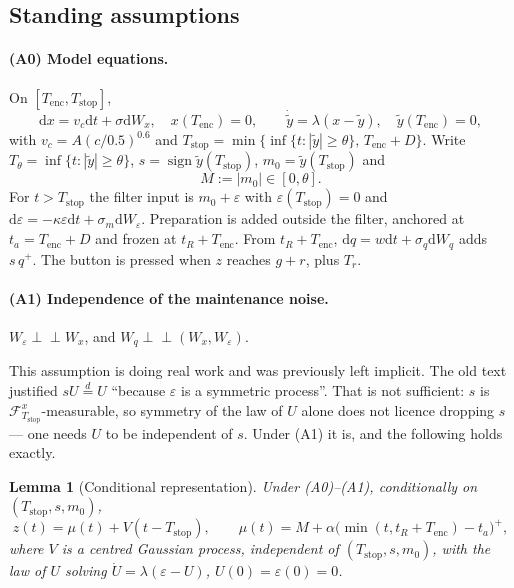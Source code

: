 \documentclass[11pt,a4paper]{article}
\newcommand{\dd}{\mathrm{d}}
\newcommand{\Tstop}{T_{\text{stop}}}
\newcommand{\Mrv}{M}
\theoremstyle{plain}
\newtheorem{lemma}{Lemma}
\theoremstyle{remark}
\begin{document}
\subsection{Standing assumptions}
\label{sec:assump}

\paragraph{(A0) Model equations.} On $[T_{\text{enc}},\Tstop]$,
\begin{equation}
\dd x=v_c\dd t+\sigma\dd W_x,\quad x(T_{\text{enc}})=0,
\qquad \dot{\tilde y}=\lambda(x-\tilde y),\quad \tilde y(T_{\text{enc}})=0,
\label{eq:acc}
\end{equation}
with $v_c=A(c/0.5)^{0.6}$ and
$\Tstop=\min\{\inf\{t:|\tilde y|\ge\theta\},\,T_{\text{enc}}+D\}$. Write
$T_\theta=\inf\{t:|\tilde y|\ge\theta\}$, $s=\operatorname{sign}\tilde y(\Tstop)$,
$m_0=\tilde y(\Tstop)$ and
\begin{equation}
\Mrv:=|m_0|\in[0,\theta].
\end{equation}
For $t>\Tstop$ the filter input is $m_0+\varepsilon$ with $\varepsilon(\Tstop)=0$ and
$\dd\varepsilon=-\kappa\varepsilon\dd t+\sigma_m\dd W_\varepsilon$. Preparation is added
outside the filter, anchored at $t_a=T_{\text{enc}}+D$ and frozen at
$t_R+T_{\text{enc}}$. From $t_R+T_{\text{enc}}$, $\dd q=w\dd t+\sigma_q\dd W_q$ adds
$s\,q^{+}$. The button is pressed when $z$ reaches $g+r$, plus $T_r$.

\paragraph{(A1) Independence of the maintenance noise.}
$W_\varepsilon\perp\!\!\!\perp W_x$, and $W_q\perp\!\!\!\perp(W_x,W_\varepsilon)$.

This assumption is doing real work and was previously left implicit. The old text
justified $sU\stackrel{d}{=}U$ ``because $\varepsilon$ is a symmetric process''. That is
not sufficient: $s$ is $\mathcal F^{x}_{\Tstop}$-measurable, so symmetry of the law of
$U$ alone does not licence dropping $s$ --- one needs $U$ to be independent of $s$. Under
(A1) it is, and the following holds exactly.

\begin{lemma}[Conditional representation]
\label{lem:cond}
Under (A0)--(A1), conditionally on $(\Tstop,s,m_0)$,
\begin{equation}
z(t)=\mu(t)+V(t-\Tstop),\qquad
\mu(t)=\Mrv+\alpha\bigl(\min(t,t_R+T_{\text{enc}})-t_a\bigr)^{+},
\label{eq:decomp}
\end{equation}
where $V$ is a centred Gaussian process, independent of $(\Tstop,s,m_0)$, with the law of
$U$ solving $\dot U=\lambda(\varepsilon-U)$, $U(0)=\varepsilon(0)=0$.
\end{lemma}
\end{document}
